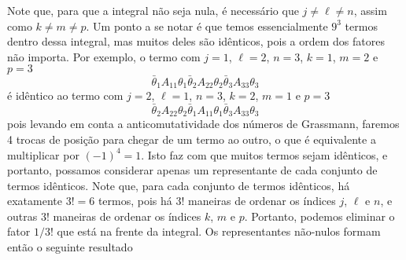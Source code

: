 Note que, para que a integral não seja nula, é necessário que $j \neq \ell \neq n$, assim como $k \neq m \neq p$. Um ponto a se notar é que temos essencialmente $9^{3}$ termos dentro dessa integral, mas muitos deles são idênticos, pois a ordem dos fatores não importa. Por exemplo, o termo com $j=1$, $\ell=2$, $n=3$, $k=1$, $m=2$ e $p=3$
    \begin{equation*}
        \bar{\theta}_{1}A_{11}\theta_{1}\bar{\theta}_{2}A_{22}\theta_{2}\bar{\theta}_{3}A_{33}\theta_{3}
    \end{equation*}
é idêntico ao termo com $j=2$, $\ell=1$, $n=3$, $k=2$, $m=1$ e $p=3$
    \begin{equation*}
        \bar{\theta}_{2}A_{22}\theta_{2}\bar{\theta}_{1}A_{11}\theta_{1}\bar{\theta}_{3}A_{33}\theta_{3}
    \end{equation*}
pois levando em conta a anticomutatividade dos números de Grassmann, faremos 4 trocas de posição para chegar de um termo ao outro, o que é equivalente a multiplicar por $(-1)^{4} = 1$. Isto faz com que muitos termos sejam idênticos, e portanto, possamos considerar apenas um representante de cada conjunto de termos idênticos. Note que, para cada conjunto de termos idênticos, há exatamente $3! = 6$ termos, pois há $3!$ maneiras de ordenar os índices $j$, $\ell$ e $n$, e outras $3!$ maneiras de ordenar os índices $k$, $m$ e $p$. Portanto, podemos eliminar o fator $1/3!$ que está na frente da integral. Os representantes não-nulos formam então o seguinte resultado
